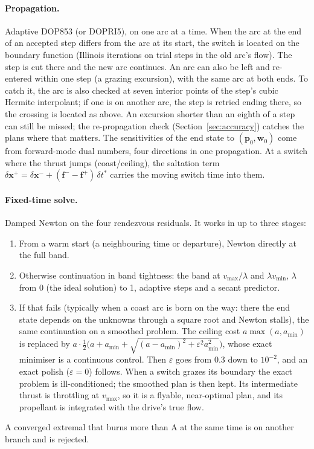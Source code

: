 \documentclass[10pt,a4paper]{article}
\begin{document}
\paragraph{Propagation.} Adaptive DOP853 (or DOPRI5), on one arc at a time. When the arc at the end of an accepted
step differs from the arc at its start, the switch is located on the boundary function (Illinois iterations on
trial steps in the old arc's flow). The step is cut there and the new arc continues. An arc can also be left and re-entered within one step (a grazing
excursion), with the same arc at both ends. To catch it, the arc is also checked at seven interior points of the
step's cubic Hermite interpolant; if one is on another arc, the step is retried ending there, so the crossing is
located as above. An excursion shorter than an eighth of a step can still be missed; the re-propagation check
(Section~\ref{sec:accuracy}) catches the plans where that matters. The sensitivities of the end
state to $(\mathbf p_0, \mathbf w_0)$ come from forward-mode dual numbers, four directions in one propagation. At a
switch where the thrust jumps (coast/ceiling), the saltation term
$\delta\mathbf x^+ = \delta\mathbf x^- + (\mathbf f^- - \mathbf f^+)\,\delta t^*$ carries the moving switch time into
them.

\paragraph{Fixed-time solve.} Damped Newton on the four rendezvous residuals. It works in up to three stages:
\begin{enumerate}
\item From a warm start (a neighbouring time or departure), Newton directly at the full band.
\item Otherwise continuation in band tightness: the band at $v_{\max}/\lambda$ and $\lambda v_{\min}$, $\lambda$ from
  0 (the ideal solution) to 1, adaptive steps and a secant predictor.
\item If that fails (typically when a coast arc is born on the way: there the end state depends on the unknowns
  through a square root and Newton stalls), the same continuation on a smoothed problem. The ceiling cost
  $a\max(a, a_{\min})$ is replaced by $a\cdot\tfrac12\big(a + a_{\min} + \sqrt{(a-a_{\min})^2 + \varepsilon^2 a_{\min}^2}\big)$,
  whose exact minimiser is a continuous control. Then $\varepsilon$ goes from 0.3 down to $10^{-2}$, and an exact
  polish ($\varepsilon = 0$) follows. When a switch grazes its boundary the exact problem is ill-conditioned; the
  smoothed plan is then kept. Its intermediate thrust is throttling at $v_{\max}$, so it is a flyable,
  near-optimal plan, and its propellant is integrated with the drive's true flow.
\end{enumerate}
A converged extremal that burns more than A at the same time is on another branch and is rejected.
\end{document}
